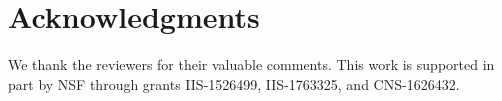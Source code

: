 \section{Acknowledgments}
We thank the reviewers for their valuable comments. This work is supported in part by NSF through grants IIS-1526499, IIS-1763325, and CNS-1626432.